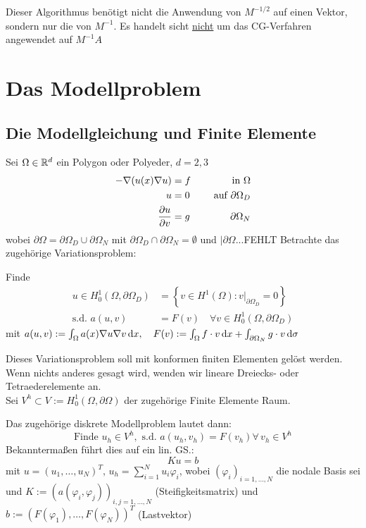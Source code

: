 \begin{bemerkung}
  Dieser Algorithmus benötigt nicht die Anwendung von $M^{-1/2}$ auf einen Vektor, sondern nur die von $M^{-1}$. Es handelt sicht \underline{nicht} um das CG-Verfahren angewendet auf $M^{-1}A$
\end{bemerkung}

\chapter{Das Modellproblem}
\section{Die Modellgleichung und Finite Elemente}
Sei $\Omega\in\mathbb{R}^d$ ein Polygon oder Polyeder, $d=2,3$
\begin{equation}
  \begin{aligned}
    -\nabla (u(x) \nabla u) &= f &\quad \textnormal{ in } \Omega\\
    u &= 0 &\quad \textnormal{ auf } \partial\Omega_D\\
    \frac{\partial u}{\partial v} &= g &\quad \partial\Omega_N
  \label{}
  \end{aligned}
\end{equation}
wobei $\partial\Omega = \partial\Omega_D \cup \partial\Omega_N$ mit $\partial\Omega_D\cap\partial\Omega_N=\emptyset$ und $|\partial\Omega .. .$FEHLT
Betrachte das zugehörige Variationsproblem:
\begin{problem}
  Finde
  \begin{align*}
    u\in H_0^1(\Omega,\partial\Omega_D) &= \left\{ v\in H^1(\Omega): v|_{\partial\Omega_D} =0 \right\}\\
    \text{s.d. } a(u,v) &= F(v) \quad \forall v\in H_0^1(\Omega,\partial\Omega_D)
  \end{align*}
  mit $a(u,v) := \int_{\Omega} a(x) \nabla u \nabla v \,\textnormal{d} x, 
     \quad F(v):=\int_\Omega f\cdot v \,\textnormal{d} x + \int_{\partial\Omega_N}g\cdot v \,\textnormal{d} \sigma$ 
\end{problem}

Dieses Variationsproblem soll mit konformen finiten Elementen gelöst werden. Wenn nichts anderes gesagt wird, wenden wir lineare Dreiecks- oder Tetraederelemente an. \\
Sei $V^h\subset V := H_0^1(\Omega,\partial\Omega)$ der zugehörige Finite Elemente Raum. 

Das zugehörige diskrete Modellproblem lautet dann:
\begin{equation}
	\text{Finde } u_h \in V^h, \text{ s.d. } a(u_h,v_h)=F(v_h) \forall \, v_h \in V^h 
\end{equation}
Bekanntermaßen führt dies auf ein lin. GS.:
\[ Ku=b \]
mit $u=(u_1,\dots , u_N)^T , \, u_h = \sum_{i=1}^N u_i \varphi_i $, wobei $(\varphi_i)_{i=1,\dots , N}$ die nodale Basis sei und $K:= (a(\varphi_i,\varphi_j))_{i,j=1,\dots ,N}$ (Steifigkeitsmatrix) und $b:= (F(\varphi_1),\dots, F(\varphi_N))^T$ (Lastvektor)\\

